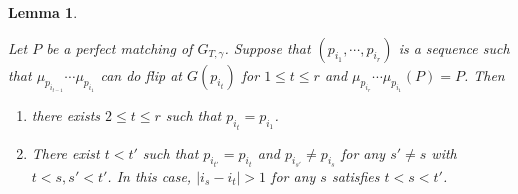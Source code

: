 \documentclass[10pt]{amsart}
\theoremstyle{theorems}
\newtheorem{Lemma}[Theorem]{Lemma}
\begin{document}
\medskip

\begin{Lemma}\label{reduction}

Let $P$ be a perfect matching of $G_{T,\gamma}$. Suppose that $(p_{i_1},\cdots,p_{i_r})$ is a sequence such that $\mu_{p_{i_{t-1}}}\cdots\mu_{p_{i_1}}$ can do flip at $G(p_{i_t})$ for $1\leq t\leq r$ and $\mu_{p_{i_r}}\cdots\mu_{p_{i_1}}(P)=P$. Then

\begin{enumerate}[$(1)$]

  \item there exists $2\leq t\leq r$ such that $p_{i_t}=p_{i_1}$.

  \item There exist $t<t'$ such that $p_{i_{t'}}=p_{i_{t}}$ and $p_{i_{s'}}\neq p_{i_s}$ for any $s'\neq s$ with $t<s,s'<t'$. In this case, $|i_s-i_t|> 1$ for any $s$ satisfies $t<s<t'$.

\end{enumerate}

\end{Lemma}
\end{document}
